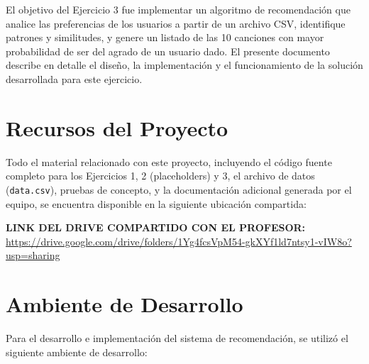 \documentclass{article}
\begin{document}
El objetivo del Ejercicio 3 fue implementar un algoritmo de recomendación que analice las preferencias de los usuarios a partir de un archivo CSV, identifique patrones y similitudes, y genere un listado de las 10 canciones con mayor probabilidad de ser del agrado de un usuario dado. El presente documento describe en detalle el diseño, la implementación y el funcionamiento de la solución desarrollada para este ejercicio.

\section{Recursos del Proyecto}

Todo el material relacionado con este proyecto, incluyendo el código fuente completo para los Ejercicios 1, 2 (placeholders) y 3, el archivo de datos (\texttt{data.csv}), pruebas de concepto, y la documentación adicional generada por el equipo, se encuentra disponible en la siguiente ubicación compartida:

\vspace{0.5em} %
\noindent \textbf{LINK DEL DRIVE COMPARTIDO CON EL PROFESOR:} \\
\href{https://drive.google.com/drive/folders/1Yg4fcsVpM54-gkXYf1ld7ntsy1-vIW8o?usp=sharing}{https://drive.google.com/drive/folders/1Yg4fcsVpM54-gkXYf1ld7ntsy1-vIW8o?usp=sharing}

\section{Ambiente de Desarrollo}

Para el desarrollo e implementación del sistema de recomendación, se utilizó el siguiente ambiente de desarrollo:
\end{document}
